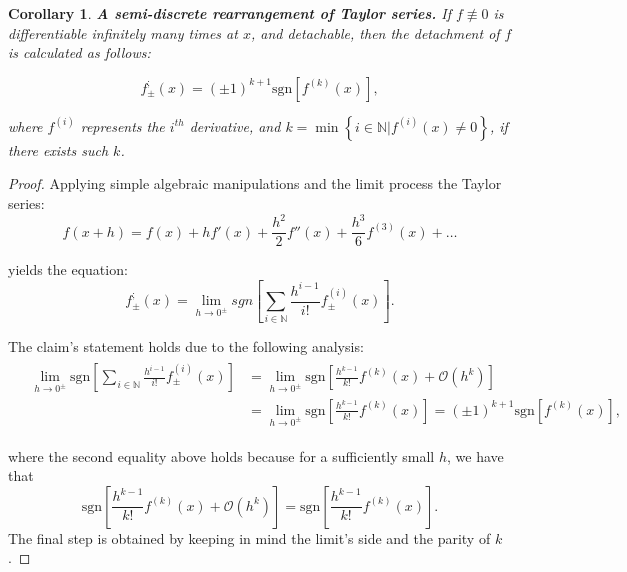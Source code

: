\documentclass[11pt]{book}
\newtheorem{crl}[thm]{Corollary}
\begin{document}
\begin{crl}\label{taylor}\textbf{A semi-discrete rearrangement of Taylor series.} If $f\not\equiv0$ is differentiable infinitely many times at $x$, and detachable, then the detachment of $f$ is calculated as follows:

$$f_{\pm}^{;}\left(x\right)=\left(\pm1\right)^{k+1}\text{sgn}\left[f^{\left(k\right)}\left(x\right)\right],$$

where $f^{\left(i\right)}$ represents the $i^{th}$ derivative, and $k=\min\left\{ i\in\mathbb{N}|f^{\left(i\right)}\left(x\right)\neq0\right\}$, if there exists such $k$.
\label{semi_discrete_taylor}
\end{crl}
\begin{proof}Applying simple algebraic manipulations and the limit process the Taylor series: $$f(x+h)=f(x)+hf'(x)+\frac{h^{2}}{2}f''(x)+\frac{h^{3}}{6}f^{(3)}(x)+\ldots$$

yields the equation:
$$f_{\pm}^{;}\left(x\right)=\underset{{\scriptscriptstyle h\rightarrow0^{\pm}}}{\lim}sgn\left[\underset{{\scriptscriptstyle i\in\mathbb{N}}}{\overset{}{\sum}}\frac{h^{i-1}}{i!}f_{\pm}^{\left(i\right)}\left(x\right)\right].$$

The claim's statement holds due to the following analysis:
\begin{align}
&\begin{aligned}
\underset{{\scriptscriptstyle h\rightarrow0^{\pm}}}{\lim}\text{sgn}\left[\underset{{\scriptscriptstyle i\in\mathbb{N}}}{\overset{}{\sum}}\frac{h^{i-1}}{i!}f_{\pm}^{\left(i\right)}\left(x\right)\right] &= \underset{{\scriptscriptstyle h\rightarrow0^{\pm}}}{\lim}\text{sgn}\left[\frac{h^{k-1}}{k!}f^{\left(k\right)}\left(x\right)+\mathcal{O}\left(h^{k}\right)\right] \\ 
&=\underset{{\scriptscriptstyle h\rightarrow0^{\pm}}}{\lim}\text{sgn}\left[\frac{h^{k-1}}{k!}f^{\left(k\right)}\left(x\right)\right]=\left(\pm1\right)^{k+1}\text{sgn}\left[f^{\left(k\right)}\left(x\right)\right],
\end{aligned}
\end{align}

where the second equality above holds because for a sufficiently small $h$, we have that $$\text{sgn}\left[\frac{h^{k-1}}{k!}f^{\left(k\right)}\left(x\right)+\mathcal{O}\left(h^{k}\right)\right]=\text{sgn}\left[\frac{h^{k-1}}{k!}f^{\left(k\right)}\left(x\right)\right].$$
The final step is obtained by keeping in mind the limit’s side and the parity of $k$.
\end{proof}
\end{document}
